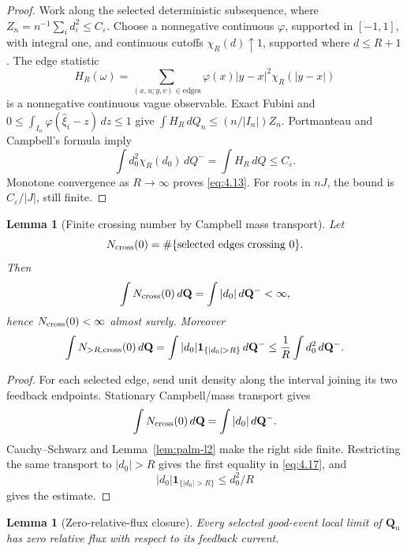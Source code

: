 \documentclass[11pt,reqno]{amsart}
\newtheorem{lemma}[theorem]{Lemma}
\theoremstyle{definition}
\theoremstyle{remark}
\numberwithin{equation}{section}
\begin{document}
\begin{proof}
Work along the selected deterministic subsequence, where
\(Z_n=n^{-1}\sum_i d_i^2\le C_\varepsilon\).  Choose a nonnegative
continuous \(\varphi\), supported in \([-1,1]\), with integral one,
and continuous cutoffs \(\chi_R(d)\uparrow1\), supported where
\(d\le R+1\).  The edge statistic
\[
H_R(\omega)=\sum_{(x,u;y,v)\in\mathrm{edges}}
 \varphi(x)|y-x|^2\chi_R(|y-x|)
\]
is a nonnegative continuous vague observable.  Exact Fubini and
\(0\le\int_{I_n}\varphi(\widehat\xi_i-z)\,dz\le1\) give
\(\int H_R\,dQ_n\le(n/|I_n|)Z_n\).
Portmanteau and Campbell's formula imply
\[
\int d_0^2\chi_R(d_0)\,dQ^-
 =\int H_R\,dQ\le C_\varepsilon.
\]
Monotone convergence as \(R\to\infty\) proves \eqref{eq:4.13}.
For roots in \(nJ\), the bound is \(C_\varepsilon/|J|\), still finite.
\end{proof}

\begin{lemma}[Finite crossing number by Campbell mass transport]
\label{lem:finite-crossings}
Let
\[
N_{\rm cross}(0)
=
\#\{\text{selected edges crossing }0\}.
\]
Then
\begin{equation}
\int N_{\rm cross}(0)\,d\mathbf Q
=
\int |d_0|\,d\mathbf Q^-<\infty,
\label{eq:4.16}
\end{equation}
hence \(N_{\rm cross}(0)<\infty\) almost surely.  Moreover
\begin{equation}
\int N_{>R,\rm cross}(0)\,d\mathbf Q
=
\int |d_0|\mathbf1_{\{|d_0|>R\}}\,d\mathbf Q^-
\le
\frac1R\int d_0^2\,d\mathbf Q^-.
\label{eq:4.17}
\end{equation}
\end{lemma}

\begin{proof}
For each selected edge, send unit density along the interval joining its
two feedback endpoints.  Stationary Campbell/mass transport gives
\[
\int N_{\rm cross}(0)\,d\mathbf Q
=
\int |d_0|\,d\mathbf Q^-.
\]
Cauchy--Schwarz and Lemma~\ref{lem:palm-l2} make the right side finite.
Restricting the same transport to \(|d_0|>R\) gives the first equality
in \eqref{eq:4.17}, and
\[
|d_0|\mathbf1_{\{|d_0|>R\}}\le d_0^2/R
\]
gives the estimate.
\end{proof}

\begin{lemma}[Zero-relative-flux closure]
\label{lem:zero-flux}
Every selected good-event local limit of \(\mathbf Q_n\) has zero
relative flux with respect to its feedback current.
\end{lemma}
\end{document}
